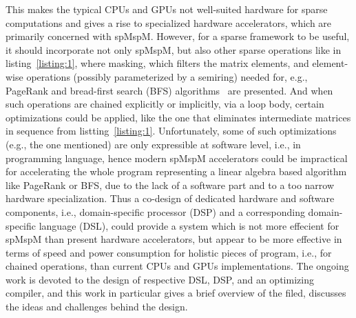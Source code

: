 \documentclass[10pt,conference]{IEEEtran}
\begin{document}
This makes the typical CPUs and GPUs not well-suited hardware for sparse computations and gives a rise to specialized hardware accelerators, which are primarily concerned with spMspM.
However, for a sparse framework to be useful, it should incorporate not only spMspM, but also other sparse operations like in listing~\ref{listing:1}, where masking, which filters the matrix elements, and element-wise operations (possibly parameterized by a semiring) needed for, e.g., PageRank and bread-first search (BFS) algorithms~\cite{yang2020graphblast} are presented.
And when such operations are chained explicitly or implicitly, via a loop body, certain optimizations could be applied, like the one that eliminates intermediate matrices in sequence from listting~\ref{listing:1}.
Unfortunately, some of such optimizations (e.g., the one mentioned) are only expressible at software level, i.e., in programming language, hence modern spMspM accelerators could be impractical for accelerating the whole program representing a linear algebra based algorithm like PageRank or BFS, due to the lack of a software part and to a too narrow hardware specialization.
Thus a co-design of dedicated hardware and software components, i.e., domain-specific processor (DSP) and a corresponding domain-specific language (DSL), could provide a system which is not more effecient for spMspM than present hardware accelerators, but appear to be more effective in terms of speed and power consumption for holistic pieces of program, i.e., for chained operations, than current CPUs and GPUs implementations.
The ongoing work is devoted to the design of respective DSL, DSP, and an optimizing compiler, and this work in particular gives a brief overview of the filed, discusses the ideas and challenges behind the design. 




\end{document}
